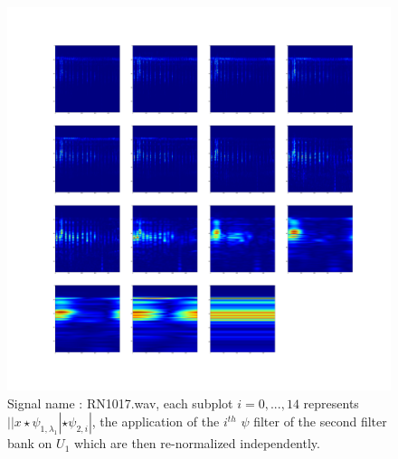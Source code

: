 \documentclass[a4paper]{report}
\begin{document}
\begin{figure}[H]
\begin{center}
\includegraphics[scale=0.1]{RN1017_1.png}\caption{Signal name : RN1017.wav, each subplot $i=0,...,14$ represents $||x \star \psi_{1,\lambda_1}|\star \psi_{2,i}|$, the application of the $i^{th}$ $\psi$ filter of the second filter bank on $U_1$ which are then re-normalized independently.}
\end{center}
\end{figure}
\end{document}

